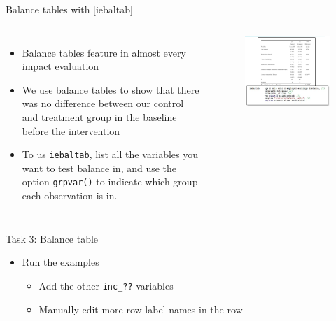 \documentclass[aspectratio=169]{beamer}
\begin{document}
\begin{frame}[fragile]{Balance tables with [iebaltab]}
	\begin{columns}[c]
		\begin{itemize}
			\item Balance tables feature in almost every impact evaluation
			\item We use balance tables to show that there was no difference between our control and treatment group in the baseline before the intervention
			\item To us \texttt{iebaltab}, list all the variables you want to test balance in, and use the option \texttt{grpvar()} to indicate which group each observation is in.
		\end{itemize}
		\begin{figure}
			\centering
			\includegraphics[width=\linewidth]{img/iedbaltab}
		\end{figure}
	\end{columns}
\end{frame}


\begin{frame}{Task 3: Balance table}
	\begin{itemize}
		\item Run the examples
		\begin{itemize}
			\item Add the other \texttt{inc\_??} variables
			\item Manually edit more row label names in the row
		\end{itemize}
	\end{itemize}
\end{frame}
\end{document}
